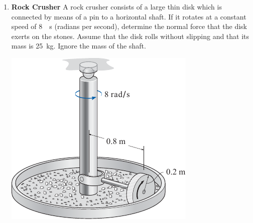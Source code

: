 \documentclass[11pt, english, a4paper, twoside]{article}
\begin{document}
\begin{enumerate}
	\item 
	\begin{minipage}[t][3.5cm]{0.65\textwidth}
		\textbf{Rock Crusher}
		A rock crusher consists of a large thin disk which is connected by means of a pin to a horizontal shaft.
		If it rotates at a constant speed of \SI{8}{\per\second} (radians per second), determine the normal force that the disk exerts on the stones.
		Assume that the disk rolls without slipping and that its mass is \SI{25}{\kilo\gram}.
		Ignore the mass of the shaft.
	\end{minipage}
	\begin{minipage}[c][2cm][t]{0.3\textwidth}
		\includegraphics[width=\textwidth]{figures/hibb_21-56}
	\end{minipage}


\end{enumerate}
\end{document}
